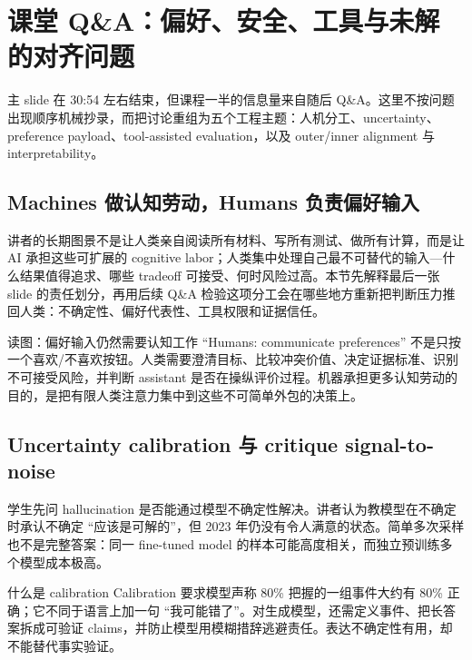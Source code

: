 \section{课堂 Q\&A：偏好、安全、工具与未解的对齐问题}

主 slide 在 30:54 左右结束，但课程一半的信息量来自随后 Q\&A。这里不按问题出现顺序机械抄录，而把讨论重组为五个工程主题：人机分工、uncertainty、preference payload、tool-assisted evaluation，以及 outer/inner alignment 与 interpretability。

\subsection{Machines 做认知劳动，Humans 负责偏好输入}

讲者的长期图景不是让人类亲自阅读所有材料、写所有测试、做所有计算，而是让 AI 承担这些可扩展的 cognitive labor；人类集中处理自己最不可替代的输入---什么结果值得追求、哪些 tradeoff 可接受、何时风险过高。本节先解释最后一张 slide 的责任划分，再用后续 Q\&A 检验这项分工会在哪些地方重新把判断压力推回人类：不确定性、偏好代表性、工具权限和证据信任。


\begin{knowledgebox}{读图：偏好输入仍然需要认知工作}
``Humans: communicate preferences'' 不是只按一个喜欢/不喜欢按钮。人类需要澄清目标、比较冲突价值、决定证据标准、识别不可接受风险，并判断 assistant 是否在操纵评价过程。机器承担更多认知劳动的目的，是把有限人类注意力集中到这些不可简单外包的决策上。
\end{knowledgebox}

\subsection{Uncertainty calibration 与 critique signal-to-noise}

学生先问 hallucination 是否能通过模型不确定性解决。讲者认为教模型在不确定时承认不确定 ``应该是可解的''，但 2023 年仍没有令人满意的状态。简单多次采样也不是完整答案：同一 fine-tuned model 的样本可能高度相关，而独立预训练多个模型成本极高。

\begin{warningbox}{什么是 calibration}
Calibration 要求模型声称 80\% 把握的一组事件大约有 80\% 正确；它不同于语言上加一句 ``我可能错了''。对生成模型，还需定义事件、把长答案拆成可验证 claims，并防止模型用模糊措辞逃避责任。表达不确定性有用，却不能替代事实验证。
\end{warningbox}

